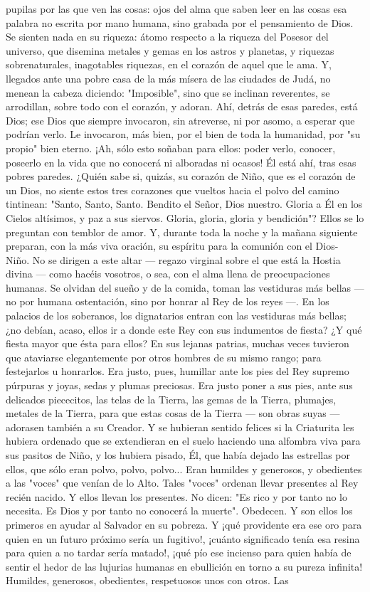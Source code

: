\documentclass[12pt]{book} %
\begin{document}
pupilas por las que ven las cosas: ojos del alma que saben leer en las cosas esa palabra no escrita por mano humana, sino grabada por el pensamiento de Dios. Se sienten nada en su riqueza: átomo respecto a la riqueza del Posesor del universo, que disemina metales y gemas en los astros y planetas, y riquezas sobrenaturales, inagotables riquezas, en el corazón de aquel que le ama. Y, llegados ante una pobre casa de la más mísera de las ciudades de Judá, no menean la cabeza diciendo: "Imposible", sino que se inclinan reverentes, se arrodillan, sobre todo con el corazón, y adoran. Ahí, detrás de esas paredes, está Dios; ese Dios que siempre invocaron, sin atreverse, ni por asomo, a esperar que podrían verlo. Le invocaron, más bien, por el bien de toda la humanidad, por "su propio" bien eterno. ¡Ah, sólo esto soñaban para ellos: poder verlo, conocer, poseerlo en la vida que no conocerá ni alboradas ni ocasos! Él está ahí, tras esas pobres paredes. ¿Quién sabe si, quizás, su corazón de Niño, que es el corazón de un Dios, no siente estos tres corazones que vueltos hacia el polvo del camino tintinean: "Santo, Santo, Santo. Bendito el Señor, Dios nuestro. Gloria a Él en los Cielos altísimos, y paz a sus siervos. Gloria, gloria, gloria y bendición"? Ellos se lo preguntan con temblor de amor. Y, durante toda la noche y la mañana siguiente preparan, con la más viva oración, su espíritu para la comunión con el Dios- Niño. No se dirigen a este altar — regazo virginal sobre el que está la Hostia divina — como hacéis vosotros, o sea, con el alma llena de preocupaciones humanas. Se olvidan del sueño y de la comida, toman las vestiduras más bellas — no por humana ostentación, sino por honrar al Rey de los reyes —. En los palacios de los soberanos, los dignatarios entran con las vestiduras más bellas; ¿no debían, acaso, ellos ir a donde este Rey con sus indumentos de fiesta? ¿Y qué fiesta mayor que ésta para ellos? En sus lejanas patrias, muchas veces tuvieron que ataviarse elegantemente por otros hombres de su mismo rango; para festejarlos u honrarlos. Era justo, pues, humillar ante los pies del Rey supremo púrpuras y joyas, sedas y plumas preciosas. Era justo poner a sus pies, ante sus delicados piececitos, las telas de la Tierra, las gemas de la Tierra, plumajes, metales de la Tierra, para que estas cosas de la Tierra — son obras suyas — adorasen también a su Creador. Y se hubieran sentido felices si la Criaturita les hubiera ordenado que se extendieran en el suelo haciendo una alfombra viva para sus pasitos de Niño, y los hubiera pisado, Él, que había dejado las estrellas por ellos, que sólo eran polvo, polvo, polvo... Eran humildes y generosos, y obedientes a las "voces" que venían de lo Alto. Tales "voces" ordenan llevar presentes al Rey recién nacido. Y ellos llevan los presentes. No dicen: "Es rico y por tanto no lo necesita. Es Dios y por tanto no conocerá la muerte". Obedecen. Y son ellos los primeros en ayudar al Salvador en su pobreza. Y ¡qué providente era ese oro para quien en un futuro próximo sería un fugitivo!, ¡cuánto significado tenía esa resina para quien a no tardar sería matado!, ¡qué pío ese incienso para quien había de sentir el hedor de las lujurias humanas en ebullición en torno a su pureza infinita! Humildes, generosos, obedientes, respetuosos unos con otros. Las 
\end{document}
